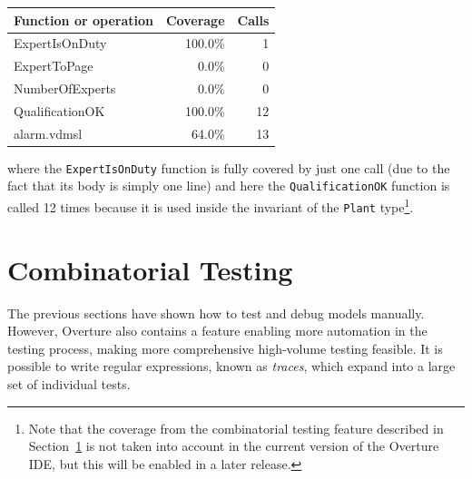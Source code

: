 %
\begin{longtable}{|l|r|r|}
\hline
Function or operation & Coverage & Calls \\
\hline
\hline
ExpertIsOnDuty & 100.0\% & 1 \\
\hline
ExpertToPage & 0.0\% & 0 \\
\hline
NumberOfExperts & 0.0\% & 0 \\
\hline
QualificationOK & 100.0\% & 12 \\
\hline
\hline
alarm.vdmsl & 64.0\% & 13 \\
\hline
\end{longtable}
%
\noindent where the \texttt{ExpertIsOnDuty} function is fully covered by just one call (due to the fact that its body is simply one line) and here the \texttt{QualificationOK} function is called 12 times
because it is used inside the invariant of the \texttt{Plant} type\footnote{Note that the coverage from the combinatorial testing feature described in Section~\ref{sec:CT} is not taken into account in the current version of the Overture IDE, but this will be enabled in a later release.}.
%
%
\section{Combinatorial Testing}\label{sec:CT}
The previous sections have shown how to test and debug models manually. However, Overture also contains a feature enabling more automation in the testing process, making more comprehensive high-volume testing feasible. It is possible to write regular expressions, known as \emph{traces}, which expand into a large set of individual tests.

